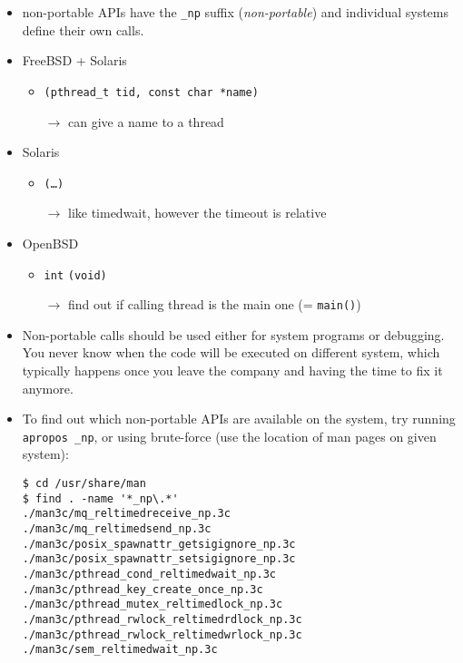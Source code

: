 

\begin{slide}

\begin{itemize}
\item non-portable APIs have the \texttt{\_np} suffix (\emph{non-portable}) and
individual systems define their own calls.

\item FreeBSD + Solaris
\begin{itemize}
\item {}\texttt{(pthread\_t tid, const char *name)}
\item[$\rightarrow$] can give a name to a thread
\end{itemize}

\item Solaris
\begin{itemize}
\item {}\texttt{(\dots)}
\item[$\rightarrow$] like timedwait, however the timeout is relative
\end{itemize}

\item OpenBSD
\begin{itemize}
\item \texttt{int} \texttt{(void)}
\item[$\rightarrow$] find out if calling thread is the main one
(= \texttt{main()})
\end{itemize}

\end{itemize}
\end{slide}

\begin{itemize}
\item Non-portable calls should be used either for system programs or
debugging. You never know when the code will be executed on different system,
which typically happens once you leave the company and having the time to
fix it anymore.
\item To find out which non-portable APIs are available on the system,
try running \texttt{apropos \_np}, or using brute-force (use the location
of man pages on given system):
\begin{verbatim}
$ cd /usr/share/man
$ find . -name '*_np\.*'
./man3c/mq_reltimedreceive_np.3c
./man3c/mq_reltimedsend_np.3c
./man3c/posix_spawnattr_getsigignore_np.3c
./man3c/posix_spawnattr_setsigignore_np.3c
./man3c/pthread_cond_reltimedwait_np.3c
./man3c/pthread_key_create_once_np.3c
./man3c/pthread_mutex_reltimedlock_np.3c
./man3c/pthread_rwlock_reltimedrdlock_np.3c
./man3c/pthread_rwlock_reltimedwrlock_np.3c
./man3c/sem_reltimedwait_np.3c
\end{verbatim}
\end{itemize}

\pagebreak

\endinput
